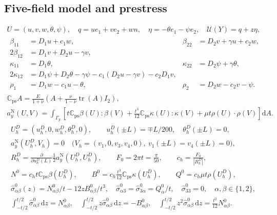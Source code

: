\subsection{Five-field model and prestress}
\begin{gather}
 U=(u,v,w,\theta,\psi),\quad
 q=u e_1+v e_2+w n,\quad \eta=-\theta e_1-\psi e_2,
 \quad\mathcal U(Y)=q+z\eta,\\
 \begin{aligned}
 \beta_{11}&=D_1u+c_1w,&\beta_{22}&=D_2v+\gamma u+c_2w,\\
 2\beta_{12}&=D_1v+D_2u-\gamma v,\\
 \kappa_{11}&=D_1\theta,&\kappa_{22}&=D_2\psi+\gamma\theta,\\
 2\kappa_{12}&=D_1\psi+D_2\theta-\gamma\psi
                 -c_1(D_2u-\gamma v)-c_2D_1v,\\
 \rho_1&=D_1w-c_1u-\theta,&\rho_2&=D_2w-c_2v-\psi.
 \end{aligned}
\end{gather}
\begin{gather}
 \mathbb C_{\mathrm{ps}}A=\frac{E}{1+\nu}
       \left(A+\frac{\nu}{1-\nu}\operatorname{tr}(A)I_2\right),\\
 a_y^{\mathrm N}(U,V)=\int_{\Gamma_y}\left[
 t\mathbb C_{\mathrm{ps}}\beta(U):\beta(V)
 +\frac{t^3}{12}\mathbb C_{\mathrm{ps}}\kappa(U):\kappa(V)
 +\mu t\rho(U)\cdot\rho(V)\right]\mathrm{d}A.
 \label{eq:experiment-naghdi-form}
\end{gather}
\begin{gather}
 U_h^D=(u_h^D,0,w_h^D,\theta_h^D,0),\qquad
 u_h^D(\pm L)=\mp L/200,\quad\theta_h^D(\pm L)=0,\\
 a_y^{\mathrm N}(U_h^D,V_h)=0
 \quad\bigl(V_h=(v_1,0,v_3,v_4,0),\ v_1(\pm L)=v_4(\pm L)=0\bigr),\\
 R_h^D=\frac{\partial}{\partial u_h^D(L)}
                  \frac12a_y^{\mathrm N}(U_h^D,U_h^D),\qquad
 F_0=2\pi t=\frac\pi{50},\qquad c_h=\frac{F_0}{|R_h^D|},\\
 N^0=c_h t\mathbb C_{\mathrm{ps}}\beta(U_h^D),\qquad
 B^0=c_h\frac{t^3}{12}\mathbb C_{\mathrm{ps}}\kappa(U_h^D),\qquad
 Q^0=c_h\mu t\rho(U_h^D),\\
 \widehat\sigma^0_{\alpha\beta}(z)=N^0_{\alpha\beta}/t
                       -12zB^0_{\alpha\beta}/t^3,\quad
 \widehat\sigma^0_{\alpha3}=\widehat\sigma^0_{3\alpha}=Q^0_\alpha/t,
 \quad\widehat\sigma^0_{33}=0,\quad \alpha,\beta\in\{1,2\},\\
 \int_{-t/2}^{t/2}\widehat\sigma^0_{\alpha\beta}\,\mathrm{d}z=N^0_{\alpha\beta},
 \quad\int_{-t/2}^{t/2}z\widehat\sigma^0_{\alpha\beta}\,\mathrm{d}z=-B^0_{\alpha\beta},
 \quad\int_{-t/2}^{t/2}z^2\widehat\sigma^0_{\alpha\beta}\,\mathrm{d}z
       =\frac{t^2}{12}N^0_{\alpha\beta}.
 \label{eq:experiment-stress}
\end{gather}
